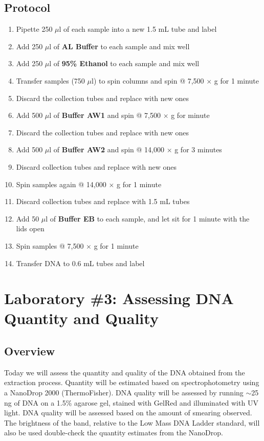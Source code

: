\documentclass[12pt, hidelinks]{article}
\begin{document}
	\subsection{Protocol}	
		\begin{enumerate}
			\item Pipette 250 $\mu$l of each sample into a new 1.5 mL tube and label
			\item Add 250 $\mu$l of \textbf{AL Buffer} to each sample and mix well
			\item Add 250 $\mu$l of \textbf{95\% Ethanol} to each sample and mix well
			\item Transfer samples (750 $\mu$l) to spin columns and spin @ 7,500 $\times$ g for 1 minute
			\item Discard the collection tubes and replace with new ones
			\item Add 500 $\mu$l of \textbf{Buffer AW1} and spin @ 7,500 $\times$ g for minute
			\item Discard the collection tubes and replace with new ones
			\item Add 500 $\mu$l of \textbf{Buffer AW2} and spin @ 14,000 $\times$ g for 3 minutes
			\item Discard collection tubes and replace with new ones
			\item Spin samples again @ 14,000 $\times$ g for 1 minute
			\item Discard collection tubes and replace with 1.5 mL tubes
			\item Add 50 $\mu$l of \textbf{Buffer EB} to each sample, and let sit for 1 minute with the lids open
			\item Spin samples @ 7,500 $\times$ g for 1 minute
			\item Transfer DNA to 0.6 mL tubes and label
		\end{enumerate}


\newpage
\section{Laboratory \#3: Assessing DNA Quantity and Quality}	

	\subsection{Overview}
	Today we will assess the quantity and quality of the DNA obtained from the extraction process. Quantity will be estimated based on spectrophotometry using a NanoDrop 2000 (ThermoFisher). DNA quality will be assessed by running $\sim$25 ng of DNA on a 1.5\% agarose gel, stained with GelRed and illuminated with UV light. DNA quality will be assessed based on the amount of smearing observed. The brightness of the band, relative to the Low Mass DNA Ladder standard, will also be used double-check the quantity estimates from the NanoDrop.
\end{document}
